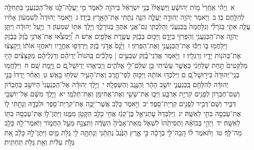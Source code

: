 \documentclass[18pt]{article}
\begin{document}
\startlock
 {\loc א~}וַֽיְהִ֗י אַֽחֲרֵי֙ מ֣וֹת יְהוֹשֻׁ֔עַ וַֽיִּשְׁאֲלוּ֙ בְּנֵ֣י יִשְׂרָאֵ֔ל בַּיהֹוָ֖ה לֵאמֹ֑ר מִ֣י יַעֲלֶה־לָּ֧נוּ אֶל־הַֽכְּנַעֲנִ֛י בַּתְּחִלָּ֖ה לְהִלָּ֥חֶם בּֽוֹ׃ \startlock
 {\loc ב~}וַיֹּ֥אמֶר יְהֹוָ֖ה יְהוּדָ֣ה יַעֲלֶ֑ה הִנֵּ֛ה נָתַ֥תִּי אֶת־הָאָ֖רֶץ בְּיָדֽוֹ׃ \startlock
 {\loc ג~}וַיֹּ֣אמֶר יְהוּדָה֩ לְשִׁמְע֨וֹן אָחִ֜יו עֲלֵ֧ה אִתִּ֣י בְגֹרָלִ֗י וְנִֽלָּחֲמָה֙ בַּֽכְּנַעֲנִ֔י וְהָלַכְתִּ֧י גַם־אֲנִ֛י אִתְּךָ֖ בְּגוֹרָלֶ֑ךָ וַיֵּ֥לֶךְ אִתּ֖וֹ שִׁמְעֽוֹן׃ \startlock
 {\loc ד~}וַיַּ֣עַל יְהוּדָ֔ה וַיִּתֵּ֧ן יְהֹוָ֛ה אֶת־הַכְּנַעֲנִ֥י וְהַפְּרִזִּ֖י בְּיָדָ֑ם וַיַּכּ֣וּם בְּבֶ֔זֶק עֲשֶׂ֥רֶת אֲלָפִ֖ים אִֽישׁ׃ \startlock
 {\loc ה~}וַֽ֠יִּמְצְא֠וּ אֶת־אֲדֹנִ֥י בֶ֙זֶק֙ בְּבֶ֔זֶק וַיִּֽלָּחֲמ֖וּ בּ֑וֹ וַיַּכּ֕וּ אֶת־הַֽכְּנַעֲנִ֖י וְאֶת־הַפְּרִזִּֽי׃ \startlock
 {\loc ו~}וַיָּ֙נׇס֙ אֲדֹ֣נִי בֶ֔זֶק וַֽיִּרְדְּפ֖וּ אַחֲרָ֑יו וַיֹּאחֲז֣וּ אוֹת֔וֹ וַֽיְקַצְּצ֔וּ אֶת־בְּהֹנ֥וֹת יָדָ֖יו וְרַגְלָֽיו׃ \startlock
 {\loc ז~}וַיֹּ֣אמֶר אֲדֹֽנִי־בֶ֗זֶק שִׁבְעִ֣ים  |  מְלָכִ֡ים בְּֽהֹנוֹת֩ יְדֵיהֶ֨ם וְרַגְלֵיהֶ֜ם מְקֻצָּצִ֗ים הָי֤וּ מְלַקְּטִים֙ תַּ֣חַת שֻׁלְחָנִ֔י כַּאֲשֶׁ֣ר עָשִׂ֔יתִי כֵּ֥ן שִׁלַּם־לִ֖י אֱלֹהִ֑ים וַיְבִיאֻ֥הוּ יְרֽוּשָׁל ַ֖͏ְם ם וַיָּ֥מׇת שָֽׁם׃ \startlock
 {\loc ח~}וַיִּלָּחֲמ֤וּ בְנֵֽי־יְהוּדָה֙ בִּיר֣וּשָׁל ַ֔͏ְם ם וַיִּלְכְּד֣וּ אוֹתָ֔הּ וַיַּכּ֖וּהָ לְפִי־חָ֑רֶב וְאֶת־הָעִ֖יר שִׁלְּח֥וּ בָאֵֽשׁ׃ \startlock
 {\loc ט~}וְאַחַ֗ר יָֽרְדוּ֙ בְּנֵ֣י יְהוּדָ֔ה לְהִלָּחֵ֖ם בַּֽכְּנַעֲנִ֑י יוֹשֵׁ֣ב הָהָ֔ר וְהַנֶּ֖גֶב וְהַשְּׁפֵלָֽה׃ \startlock
 {\loc י~}וַיֵּ֣לֶךְ יְהוּדָ֗ה אֶל־הַֽכְּנַעֲנִי֙ הַיּוֹשֵׁ֣ב בְּחֶבְר֔וֹן וְשֵׁם־חֶבְר֥וֹן לְפָנִ֖ים קִרְיַ֣ת אַרְבַּ֑ע וַיַּכּ֛וּ אֶת־שֵׁשַׁ֥י וְאֶת־אֲחִימַ֖ן וְאֶת־תַּלְמָֽי׃ \startlock
 {\loc יא~}וַיֵּ֣לֶךְ מִשָּׁ֔ם אֶל־יוֹשְׁבֵ֖י דְּבִ֑יר וְשֵׁם־דְּבִ֥יר לְפָנִ֖ים קִרְיַת־סֵֽפֶר׃ \startlock
 {\loc יב~}וַיֹּ֣אמֶר כָּלֵ֔ב אֲשֶׁר־יַכֶּ֥ה אֶת־קִרְיַת־סֵ֖פֶר וּלְכָדָ֑הּ וְנָתַ֥תִּי ל֛וֹ אֶת־עַכְסָ֥ה בִתִּ֖י לְאִשָּֽׁה׃ \startlock
 {\loc יג~}וַֽיִּלְכְּדָהּ֙ עׇתְנִיאֵ֣ל בֶּן־קְנַ֔ז אֲחִ֥י כָלֵ֖ב הַקָּטֹ֣ן מִמֶּ֑נּוּ וַיִּתֶּן־ל֛וֹ אֶת־עַכְסָ֥ה בִתּ֖וֹ לְאִשָּֽׁה׃ \startlock
 {\loc יד~}וַיְהִ֣י בְּבוֹאָ֗הּ וַתְּסִיתֵ֙הוּ֙ לִשְׁאֹ֤ל מֵֽאֵת־אָבִ֙יהָ֙ הַשָּׂדֶ֔ה וַתִּצְנַ֖ח מֵעַ֣ל הַחֲמ֑וֹר וַיֹּֽאמֶר־לָ֥הּ כָּלֵ֖ב מַה־לָּֽךְ׃ \startlock
 {\loc טו~}וַתֹּ֨אמֶר ל֜וֹ הָֽבָה־לִּ֣י בְרָכָ֗ה כִּ֣י אֶ֤רֶץ הַנֶּ֙גֶב֙ נְתַתָּ֔נִי וְנָתַתָּ֥ה לִ֖י גֻּלֹּ֣ת מָ֑יִם וַיִּתֶּן־לָ֣הּ כָּלֵ֗ב אֵ֚ת גֻּלֹּ֣ת עִלִּ֔ית וְאֵ֖ת גֻּלֹּ֥ת תַּחְתִּֽית׃ \startlock
\end{document}
